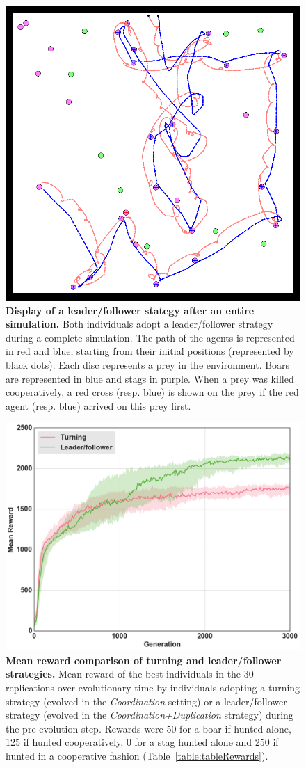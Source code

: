     \begin{figure}[h]
      \centering
        \includegraphics[width=0.7\linewidth]{fig/ArticleBio2/Fig5.png}
        \caption{\textbf{Display of a leader/follower stategy after an entire simulation.}
        Both individuals adopt a leader/follower strategy during a complete simulation. The path of the agents is represented in red and blue, starting from their initial positions (represented by black dots). Each disc represents a prey in the environment. Boars are represented in blue and stags in purple. When a prey was killed cooperatively, a red cross (resp. blue) is shown on the prey if the red agent (resp. blue) arrived on this prey first.}
      \label{fig:figLeadershipBehaviour}
    \end{figure}

    \begin{figure}[h]
      \centering
        \includegraphics[width=0.7\linewidth]{fig/ArticleBio2/Fig6.png}
        \caption{\textbf{Mean reward comparison of turning and leader/follower strategies.}
        Mean reward of the best individuals in the $30$ replications over evolutionary time by individuals adopting a turning strategy (evolved in the \emph{Coordination} setting) or a leader/follower strategy (evolved in the \emph{Coordination+Duplication} strategy) during the pre-evolution step. Rewards were 50 for a boar if hunted alone, 125 if hunted cooperatively, 0 for a stag hunted alone and 250 if hunted in a cooperative fashion (Table~\ref{table:tableRewards}).}
      \label{fig:fitnessRecyclingLeadership}
    \end{figure}


